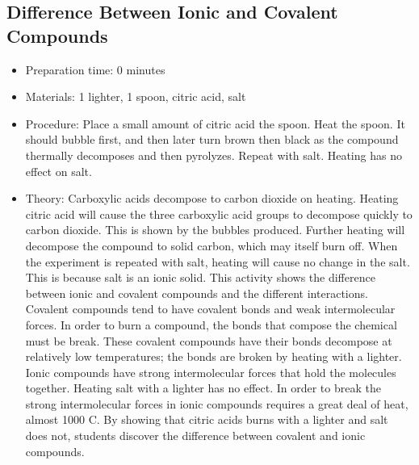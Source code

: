 \subsection{Difference Between Ionic and Covalent Compounds}
\begin{itemize}
\item{Preparation time: 0 minutes}
\item{Materials: 1 lighter, 1 spoon, citric acid, salt}
\item{Procedure: Place a small amount of citric acid the spoon. Heat the spoon. It should bubble first, and then later turn brown then black as the compound thermally decomposes and then pyrolyzes. Repeat with salt. Heating has no effect on salt.}
\item{Theory: Carboxylic acids decompose to carbon dioxide on heating. Heating citric acid will cause the three carboxylic acid groups to decompose quickly to carbon dioxide. This is shown by the bubbles produced. Further heating will decompose the compound to solid carbon, which may itself burn off. When the experiment is repeated with salt, heating will cause no change in the salt. This is because salt is an ionic solid. This activity shows the difference between ionic and covalent compounds and the different interactions. Covalent compounds tend to have covalent bonds and weak intermolecular forces. In order to burn a compound, the bonds that compose the chemical must be break. These covalent compounds have their bonds decompose at relatively low temperatures; the bonds are broken by heating with a lighter. Ionic compounds have strong intermolecular forces that hold the molecules together. Heating salt with a lighter has no effect. In order to break the strong intermolecular forces in ionic compounds requires a great deal of heat, almost 1000 C. By showing that citric acids burns with a lighter and salt does not, students discover the difference between covalent and ionic compounds.}
\end{itemize}

